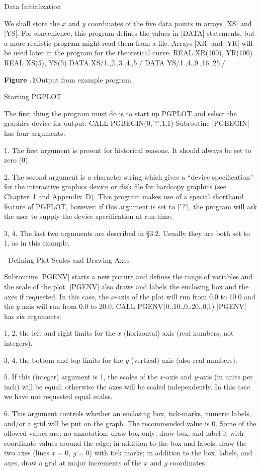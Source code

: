 \beginsection Data Initialization

We shall store the $x$ and $y$ coordinates of the five data points in
arrays |XS| and |YS|. For convenience, this program  defines the values
in |DATA| statements, but a more realistic program might read them from
a file. Arrays |XR| and |YR| will be used later in the program for the 
theoretical curve.
\begintt
      REAL XR(100), YR(100)
      REAL XS(5), YS(5)
      DATA XS/1.,2.,3.,4.,5./
      DATA YS/1.,4.,9.,16.,25./
\endtt

\topinsert
{}
\smallskip
\centerline{{\bf Figure \the\chapnum.1}\quad Output from example 
program.}
\endinsert

\beginsection Starting PGPLOT

The first thing the program must do is to start up PGPLOT and select the
graphics device for output:
\begintt
      CALL PGBEGIN(0,'?',1,1)
\endtt
Subroutine |PGBEGIN| has four arguments:
\item{1.} The first argument is present for historical reasons. It
should always be set to zero (0).
\item{2.} The second argument is a character string which gives
a ``device specification'' for
the interactive graphics device or disk file for hardcopy graphics (see
Chapter~1 and Appendix~D).  This program makes use of a special shorthand feature of
PGPLOT, however: if this argument is set to |'?'|, the program will
ask the user to supply the device specification at run-time. 
\item{3,}  4. The last two arguments are described in \S3.2.
Usually they are both set to 1, as in this example.


\beginsection Defining Plot Scales and Drawing Axes

Subroutine |PGENV| starts a new picture and defines the range of
variables and the scale of the plot.  |PGENV| also draws and labels the
enclosing box and the axes if requested. In this case, the $x$-axis of
the plot will run from 0.0 to 10.0 and the $y$ axis will run from 0.0 to
20.0. 
\begintt
      CALL PGENV(0.,10.,0.,20.,0,1)
\endtt
|PGENV| has six arguments:
\item{1,} 2. the left and right limits for
the $x$ (horizontal) axis (real numbers, not integers).
\item{3,} 4. the bottom and top limits for
the $y$ (vertical) axis (also real numbers).
\item{5.} If this (integer) argument is 1, the scales
of the $x$-axis and $y$-axis (in units per inch) will be equal; otherwise
the axes will be scaled independently. In this case we have not 
requested equal scales.
\item{6.} This argument controls whether an enclosing box, tick-marks,
numeric labels, and/or a grid will
be put on the graph. The recommended value is 0. Some of the allowed
values are: 
 no annotation;
 draw box only;
 draw box, and label it with coordinate values around the 
edge;
 in addition to the box and labels, draw the two
axes (lines $x=0$, $y=0$) with tick marks;
 in addition to the box, labels, and axes, draw
a grid at major increments of the $x$ and $y$ coordinates.

